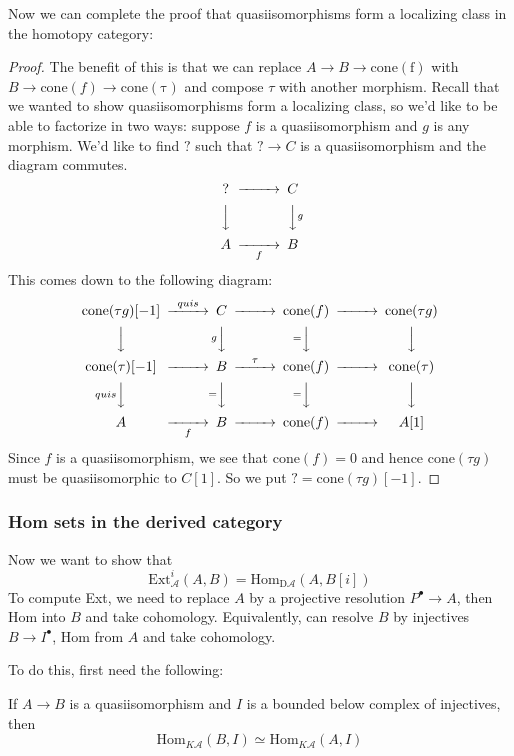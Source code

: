 Now we can complete the proof that quasiisomorphisms form a localizing class in the homotopy category:
\begin{proof}
    The benefit of this is that we can replace $A\rightarrow B\rightarrow \mathrm{cone(f)}$ with $B\rightarrow \mathrm{cone}(f)\rightarrow \mathrm{cone(\tau)}$ and compose $\tau$ with another morphism. Recall that we wanted to show quasiisomorphisms form a localizing class, so we'd like to be able to factorize in two ways: suppose $f$ is a quasiisomorphism and $g$ is any morphism. We'd like to find $?$ such that $?\rightarrow C$ is a quasiisomorphism and the diagram commutes.
    $$\begin{CD} ? @> > > C \\ @VVV @VVgV \\ A @> > f> B\end{CD}$$
    This comes down to the following diagram: 
    $$\begin{CD} \mathrm{cone}(\tau g)[-1]@> quis> > C @> > > \mathrm{cone}(f) @> > > \mathrm{cone}(\tau g)\\ @VVV @VgVV @V=VV @VVV \\ \mathrm{cone(\tau)[-1]}@> > > B @> \tau> > \mathrm{cone}(f)@> > > \mathrm{cone}(\tau) \\ @VquisVV @V=VV @V=VV @VVV \\ A @> > f > B @> > > \mathrm{cone}(f)@> > > A[1]\end{CD}$$
    Since $f$ is a quasiisomorphism, we see that $\mathrm{cone}(f)=0$ and hence $\mathrm{cone}(\tau g)$ must be quasiisomorphic to $C[1]$. So we put $?=\mathrm{cone}(\tau g)[-1]$.
\end{proof} 

\subsubsection{Hom sets in the derived category}

Now we want to show that $$\mathrm{Ext}_{\mathcal{A}}^i(A,B)=\mathrm{Hom_{D \mathcal{A}}}(A, B[i])$$
To compute Ext, we need to replace $A$ by a projective resolution $P^\bullet \rightarrow A$, then Hom into $B$ and take cohomology. Equivalently, can resolve $B$ by injectives $B\rightarrow I^\bullet$, Hom from $A$ and take cohomology.

To do this, first need the following: 

\begin{proposition}{}{}
     If $A\rightarrow B$ is a quasiisomorphism and $I$ is a bounded below complex of injectives, then $$\mathrm{Hom}_{K\mathcal{A}}(B,I)\simeq \mathrm{Hom}_{K\mathcal{A}}(A,I)$$
\end{proposition}

